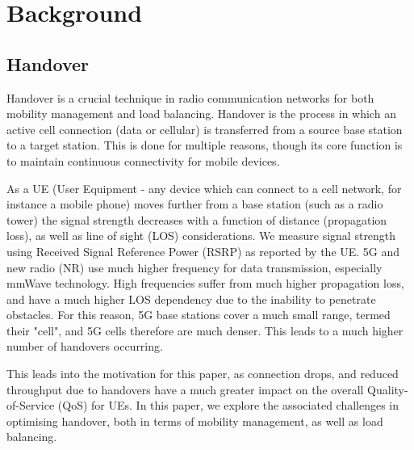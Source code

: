 \chapter{Background}
\section{Handover}
Handover is a crucial technique in radio communication networks for both mobility management and load balancing. Handover is the process in which an active cell connection (data or cellular) is transferred from a source base station to a target station. This is done for multiple reasons, though its core function is to maintain continuous connectivity for mobile devices.

As a UE (User Equipment - any device which can connect to a cell network, for instance a mobile phone) moves further from a base station (such as a radio tower) the signal strength decreases with a function of distance (propagation loss), as well as line of sight (LOS) considerations. We measure signal strength using Received Signal Reference Power (RSRP) as reported by the UE. 5G and new radio (NR) use much higher frequency for data transmission, especially mmWave technology. High frequencies suffer from much higher propagation loss, and have a much higher LOS dependency due to the inability to penetrate obstacles. For this reason, 5G base stations cover a much small range, termed their "cell", and 5G cells therefore are much denser. This leads to a much higher number of handovers occurring.


This leads into the motivation for this paper, as connection drops, and reduced throughput due to handovers have a much greater impact on the overall Quality-of-Service (QoS) for UEs. In this paper, we explore the associated challenges in optimising handover, both in terms of mobility management, as well as load balancing.

